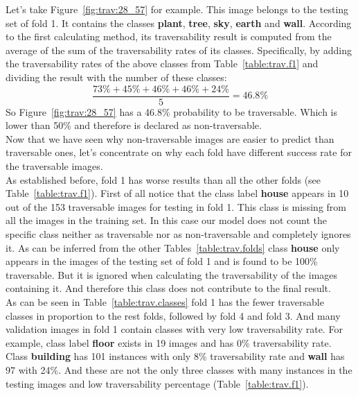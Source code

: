 \documentclass[12pt,a4paper,table,dvipsnames,tikz]{report}
\newcommand{\bl}[1]{{\hypersetup{linkcolor=blue}#1}}
\newcommand{\class}[1]{\textbf{\textcolor{#1}{#1}}} %
\begin{document}
	
	Let's take Figure~\bl{\ref{fig:trav:28_57}} for example. This image belongs to the 
	testing set of fold 1. It contains the classes \class{plant}, \class{tree}, \class{sky}, 
	\class{earth} and \class{wall}. According to the first calculating method, its 
	traversability result is computed from the average of the sum of the traversability rates of its 
	classes. Specifically, by adding the traversability rates of the above classes from 
	Table~\bl{\ref{table:trav.f1}} and dividing the result with the number of these classes: 
	\begin{equation} \label{eq:trav_5}
	\frac{73\% + 45\% + 46\% + 46\% + 24\%}{5} = 46.8\%
	\end{equation}
	So Figure~\bl{\ref{fig:trav:28_57}} has a 46.8\% probability to be traversable. Which is 
	lower than 50\% and therefore is declared as non-traversable.
	\\
	
	Now that we have seen why non-traversable images are easier to predict than traversable 
	ones, let's concentrate on why each fold have different success rate for the traversable 
	images.
	\\
	
	As established before, fold 1 has worse results than all the other folds (see 
	Table~\bl{\ref{table:trav.f1}}). First of all notice that the class label \class{house} 
	appears in 10 out of the 153 traversable images for testing in fold 1. This class is 
	missing from all the images in the training set. In this case our model does not count 
	the specific class neither as traversable nor as non-traversable and completely ignores 
	it. As can be inferred from the other Tables~\bl{\ref{table:trav.folds}} class 
	\class{house} only appears in the images of the testing set of fold 1 and is found to 
	be 100\% traversable. But it is ignored when calculating the traversability of the 
	images containing it. And therefore this class does not contribute to the final result.
	\\
	
	As can be seen in Table~\bl{\ref{table:trav.classes}} fold 1 has the fewer traversable 
	classes in proportion to the rest folds, followed by fold 4 and fold 3. And many validation 
	images in fold 1 contain classes with very low traversability rate. For example, class 
	label \class{floor} exists in 19 images and has 0\% traversability rate. Class \class{building} 
	has 101 instances with only 8\% traversability rate and \class{wall} has 97 with 24\%. 
	And these are not the only three classes with many instances in the testing images and 
	low traversability percentage (Table~\bl{\ref{table:trav.f1}}).
	\\
	
\end{document}
